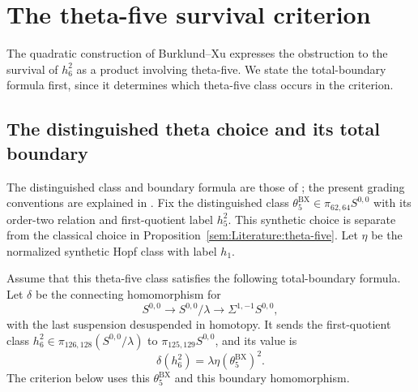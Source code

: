 \section{The theta-five survival criterion}
The quadratic construction of Burklund--Xu expresses the obstruction
to the survival of $h_6^2$ as a product involving theta-five. We state
the total-boundary formula first, since it determines which
theta-five class occurs in the criterion.

\subsection{The distinguished theta choice and its total boundary}

\begin{definition}
\label{sem:Literature:bx-choice}
\label{sem:Literature:bx-total-boundary}
The distinguished class and boundary formula are those of
\cite[Proposition 7.19 and its proof]{BurklundXu}; the present
grading conventions are explained in \cite[Remarks 7.4--7.5]{LWX126}.
Fix the distinguished class
$\theta_5^{\mathrm{BX}}\in\pi_{62,64}S^{0,0}$ with its order-two
relation and first-quotient label $h_5^2$. This synthetic choice is
separate from the classical
choice in Proposition~\ref{sem:Literature:theta-five}. Let $\eta$ be the
normalized synthetic Hopf class with label $h_1$.

Assume that this theta-five class satisfies the following
total-boundary formula.
Let $\delta$ be the connecting homomorphism for
\[
 S^{0,0}\longrightarrow S^{0,0}/\lambda
 \longrightarrow\Sigma^{1,-1}S^{0,0},
\]
with the last suspension desuspended in homotopy. It sends the
first-quotient class $h_6^2\in\pi_{126,128}(S^{0,0}/\lambda)$ to
$\pi_{125,129}S^{0,0}$, and its value is
\[
 \delta(h_6^2)=\lambda\eta(\theta_5^{\mathrm{BX}})^2.
\]
The criterion below uses this $\theta_5^{\mathrm{BX}}$ and this
boundary homomorphism.

\end{definition}


